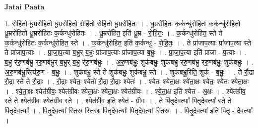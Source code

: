 \documentclass[17pt]{extarticle}
\begin{document}
\textbf{Jatai Paata} \newline

1. रोहि॑तो धू॒म्ररो॑हितो धू॒म्ररो॑हितो॒ रोहि॑तो॒ रोहि॑तो धू॒म्ररो॑हितः । . धू॒म्ररो॑हितः क॒र्कन्धु॑रोहितः क॒र्कन्धु॑रोहितो धू॒म्ररो॑हितो धू॒म्ररो॑हितः क॒र्कन्धु॑रोहितः । . धू॒म्ररो॑हित॒ इति॑ धू॒म्र - रो॒हि॒तः॒ । . क॒र्कन्धु॑रोहित॒ स्ते ते क॒र्कन्धु॑रोहितः क॒र्कन्धु॑रोहित॒ स्ते । . क॒र्कन्धु॑रोहित॒ इति॑ क॒र्कन्धु॑ - रो॒हि॒तः॒ । . ते प्रा॑जाप॒त्याः प्रा॑जाप॒त्या स्ते ते प्रा॑जाप॒त्याः । . प्रा॒जा॒प॒त्या ब॒भ्रुर् ब॒भ्रुः प्रा॑जाप॒त्याः प्रा॑जाप॒त्या ब॒भ्रुः । . प्रा॒जा॒प॒त्या इति॑ प्राजा - प॒त्याः । . ब॒भ्रु र॑रु॒णब॑भ्रु ररु॒णब॑भ्रुर् ब॒भ्रुर् ब॒भ्रु र॑रु॒णब॑भ्रुः । . अ॒रु॒णब॑भ्रुः॒ शुक॑बभ्रुः॒ शुक॑बभ्रु ररु॒णब॑भ्रु ररु॒णब॑भ्रुः॒ शुक॑बभ्रुः । . अ॒रु॒णब॑भ्रु॒रित्य॑रु॒ण - ब॒भ्रुः॒ । . शुक॑बभ्रु॒ स्ते ते शुक॑बभ्रुः॒ शुक॑बभ्रु॒ स्ते । . शुक॑बभ्रु॒रिति॒ शुक॑ - ब॒भ्रुः॒ । . ते रौ॒द्रा रौ॒द्रा स्ते ते रौ॒द्राः । . रौ॒द्राः श्येतः॒ श्येतो॑ रौ॒द्रा रौ॒द्राः श्येतः॑ । . श्येतः॑ श्येता॒क्षः श्ये॑ता॒क्षः श्येतः॒ श्येतः॑ श्येता॒क्षः । . श्ये॒ता॒क्षः श्येत॑ग्रीवः॒ श्येत॑ग्रीवः श्येता॒क्षः श्ये॑ता॒क्षः श्येत॑ग्रीवः । . श्ये॒ता॒क्ष इति॑ श्येत - अ॒क्षः । . श्येत॑ग्रीव॒ स्ते ते श्येत॑ग्रीवः॒ श्येत॑ग्रीव॒ स्ते । . श्येत॑ग्रीव॒ इति॒ श्येत॑ - ग्री॒वः॒ । . ते पि॑तृदेव॒त्याः᳚ पितृदेव॒त्या᳚ स्ते ते पि॑तृदेव॒त्याः᳚ । . पि॒तृ॒दे॒व॒त्या᳚ स्ति॒स्र स्ति॒स्रः पि॑तृदेव॒त्याः᳚ पितृदेव॒त्या᳚ स्ति॒स्रः । . पि॒तृ॒दे॒व॒त्या॑ इति॑ पितृ - दे॒व॒त्याः᳚ । \newline
\end{document}
